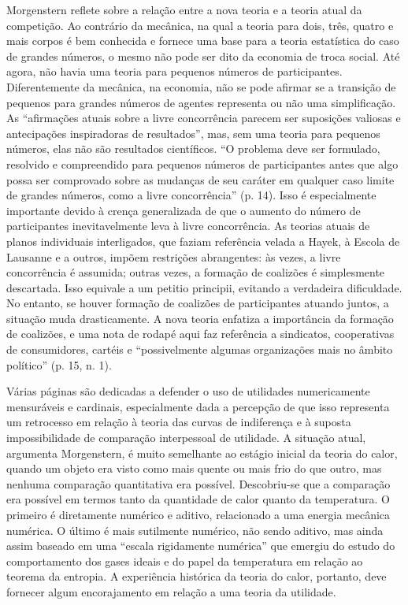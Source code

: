 \documentclass[a4paper,12pt]{article}[abntex2]
\begin{document}
Morgenstern reflete sobre a relação entre a nova teoria e a teoria atual da competição. Ao contrário da mecânica, na qual a teoria para dois, três, quatro e mais corpos é bem conhecida e fornece uma base para a teoria estatística do caso de grandes números, o mesmo não pode ser dito da economia de troca social. Até agora, não havia uma teoria para pequenos números de participantes. Diferentemente da mecânica, na economia, não se pode afirmar se a transição de pequenos para grandes números de agentes representa ou não uma simplificação. As “afirmações atuais sobre a livre concorrência parecem ser suposições valiosas e antecipações inspiradoras de resultados”, mas, sem uma teoria para pequenos números, elas não são resultados científicos. “O problema deve ser formulado, resolvido e compreendido para pequenos números de participantes antes que algo possa ser comprovado sobre as mudanças de seu caráter em qualquer caso limite de grandes números, como a livre concorrência” (p. 14). Isso é especialmente importante devido à crença generalizada de que o aumento do número de participantes inevitavelmente leva à livre concorrência. As teorias atuais de planos individuais interligados, que faziam referência velada a Hayek, à Escola de Lausanne e a outros, impõem restrições abrangentes: às vezes, a livre concorrência é assumida; outras vezes, a formação de coalizões é simplesmente descartada. Isso equivale a um petitio principii, evitando a verdadeira dificuldade. No entanto, se houver formação de coalizões de participantes atuando juntos, a situação muda drasticamente. A nova teoria enfatiza a importância da formação de coalizões, e uma nota de rodapé aqui faz referência a sindicatos, cooperativas de consumidores, cartéis e “possivelmente algumas organizações mais no âmbito político” (p. 15, n. 1).

Várias páginas são dedicadas a defender o uso de utilidades numericamente mensuráveis e cardinais, especialmente dada a percepção de que isso representa um retrocesso em relação à teoria das curvas de indiferença e à suposta impossibilidade de comparação interpessoal de utilidade. A situação atual, argumenta Morgenstern, é muito semelhante ao estágio inicial da teoria do calor, quando um objeto era visto como mais quente ou mais frio do que outro, mas nenhuma comparação quantitativa era possível. Descobriu-se que a comparação era possível em termos tanto da quantidade de calor quanto da temperatura. O primeiro é diretamente numérico e aditivo, relacionado a uma energia mecânica numérica. O último é mais sutilmente numérico, não sendo aditivo, mas ainda assim baseado em uma “escala rigidamente numérica” que emergiu do estudo do comportamento dos gases ideais e do papel da temperatura em relação ao teorema da entropia. A experiência histórica da teoria do calor, portanto, deve fornecer algum encorajamento em relação a uma teoria da utilidade.
\end{document}
